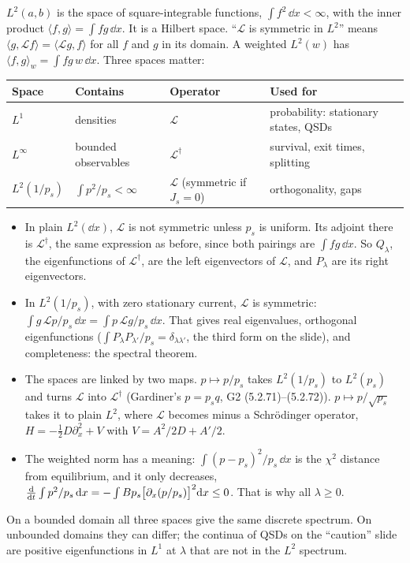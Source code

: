 \documentclass[11pt]{article}
\newcommand{\Lop}{\mathcal{L}}
\begin{document}
$L^2(a,b)$ is the space of square-integrable functions, $\int f^2\,\dd x<\infty$, with the inner product $\langle
f,g\rangle=\int fg\,\dd x$. It is a Hilbert space. ``$\Lop$ is symmetric in $L^2$'' means $\langle
g,\Lop f\rangle=\langle\Lop g,f\rangle$ for all $f$ and $g$ in its domain. A weighted $L^2(w)$ has $\langle
f,g\rangle_w=\int fg\,w\,\dd x$. Three spaces matter:

\begin{center}
\renewcommand{\arraystretch}{1.25}
\begin{tabular}{@{}llll@{}}
\toprule
Space & Contains & Operator & Used for \\
\midrule
$L^1$ & densities & $\Lop$ & probability: stationary states, QSDs \\
$L^\infty$ & bounded observables & $\Lop^\dagger$ & survival, exit times, splitting \\
$L^2(1/p_s)$ & $\int p^2/p_s<\infty$ & $\Lop$ (symmetric if $J_s=0$) & orthogonality, gaps \\
\bottomrule
\end{tabular}
\end{center}

\begin{itemize}
  \item In plain $L^2(\dd x)$, $\Lop$ is not symmetric unless $p_s$ is uniform. Its adjoint there is $\Lop^\dagger$, the same
        expression as before, since both pairings are $\int fg\,\dd x$. So $Q_\lambda$, the eigenfunctions of
        $\Lop^\dagger$, are the left eigenvectors of $\Lop$, and $P_\lambda$ are its right eigenvectors.
  \item In $L^2(1/p_s)$, with zero stationary current, $\Lop$ is symmetric:
        $\int g\,\Lop p/p_s\,\dd x=\int p\,\Lop g/p_s\,\dd x$. That gives real eigenvalues, orthogonal eigenfunctions
        ($\int P_\lambda P_{\lambda'}/p_s=\delta_{\lambda\lambda'}$, the third form on the slide), and completeness:
        the spectral theorem.
  \item The spaces are linked by two maps. $p\mapsto p/p_s$ takes $L^2(1/p_s)$ to $L^2(p_s)$ and turns $\Lop$ into
        $\Lop^\dagger$ (Gardiner's $p=p_sq$, G2 (5.2.71)--(5.2.72)). $p\mapsto p/\sqrt{p_s}$ takes it to plain $L^2$, where
        $\Lop$ becomes minus a Schr\"odinger operator, $H=-\frac12D\partial_x^2+V$ with $V=A^2/2D+A'/2$.
  \item The weighted norm has a meaning: $\int(p-p_s)^2/p_s\,\dd x$ is the $\chi^2$ distance from equilibrium, and it
        only decreases,
        $\dv{t}\int p^2/p_s\,\dd x=-\int Bp_s\bigl[\partial_x(p/p_s)\bigr]^2\dd x\le0$. That is why all $\lambda\ge0$.
\end{itemize}
On a bounded domain all three spaces give the same discrete spectrum. On unbounded domains they can differ; the
continua of QSDs on the ``caution'' slide are positive eigenfunctions in $L^1$ at $\lambda$ that are not in the $L^2$
spectrum.
\end{document}

